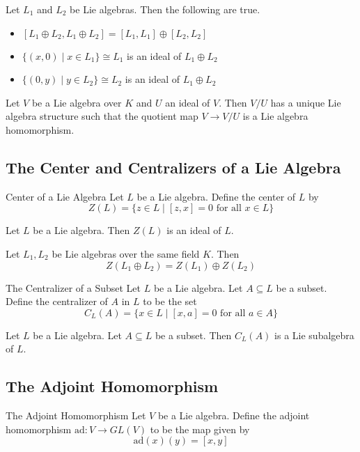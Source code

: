 \documentclass[a4paper]{article}
\begin{document}
\begin{prp}{}{} Let $L_1$ and $L_2$ be Lie algebras. Then the following are true. 
\begin{itemize}
\item $[L_1\oplus L_2,L_1\oplus L_2]=[L_1,L_1]\oplus[L_2,L_2]$
\item $\{(x,0)\;|\;x\in L_1\}\cong L_1$ is an ideal of $L_1\oplus L_2$
\item $\{(0,y)\;|\;y\in L_2\}\cong L_2$ is an ideal of $L_1\oplus L_2$
\end{itemize}
\end{prp}

\begin{prp}{}{} Let $V$ be a Lie algebra over $K$ and $U$ an ideal of $V$. Then $V/U$ has a unique Lie algebra structure such that the quotient map $V\to V/U$ is a Lie algebra homomorphism. 
\end{prp}

\subsection{The Center and Centralizers of a Lie Algebra}
\begin{defn}{Center of a Lie Algebra}{} Let $L$ be a Lie algebra. Define the center of $L$ by $$Z(L)=\{z\in L\;|\;[z,x]=0\text{ for all }x\in L\}$$
\end{defn}

\begin{lmm}{}{} Let $L$ be a Lie algebra. Then $Z(L)$ is an ideal of $L$. 
\end{lmm}

\begin{prp}{}{} Let $L_1,L_2$ be Lie algebras over the same field $K$. Then $$Z(L_1\oplus L_2)=Z(L_1)\oplus Z(L_2)$$
\end{prp}

\begin{defn}{The Centralizer of a Subset}{} Let $L$ be a Lie algebra. Let $A\subseteq L$ be a subset. Define the centralizer of $A$ in $L$ to be the set $$C_L(A)=\{x\in L\;|\;[x,a]=0\text{ for all }a\in A\}$$
\end{defn}

\begin{lmm} Let $L$ be a Lie algebra. Let $A\subseteq L$ be a subset. Then $C_L(A)$ is a Lie subalgebra of $L$. 
\end{lmm}

\subsection{The Adjoint Homomorphism}
\begin{defn}{The Adjoint Homomorphism}{} Let $V$ be a Lie algebra. Define the adjoint homomorphism $\text{ad}:V\to GL(V)$ to be the map given by $$\text{ad}(x)(y)=[x,y]$$
\end{defn}
\end{document}
